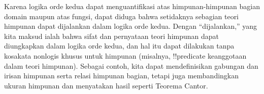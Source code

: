 \documentclass[../../../include/open-logic-section]{subfiles}
\begin{document}


Karena logika orde kedua dapat menguantifikasi atas himpunan-himpunan bagian
domain maupun atas fungsi, dapat diduga bahwa setidaknya sebagian teori
himpunan dapat dijalankan dalam logika orde kedua. Dengan ``dijalankan,''
yang kita maksud ialah bahwa sifat dan pernyataan teori himpunan dapat
diungkapkan dalam logika orde kedua, dan hal itu dapat dilakukan tanpa
kosakata nonlogis khusus untuk himpunan (misalnya, !!{predicate} keanggotaan
dalam teori himpunan). Sebagai contoh, kita dapat mendefinisikan gabungan dan
irisan himpunan serta relasi himpunan bagian, tetapi juga membandingkan ukuran
himpunan dan menyatakan hasil seperti Teorema Cantor.
\end{document}
